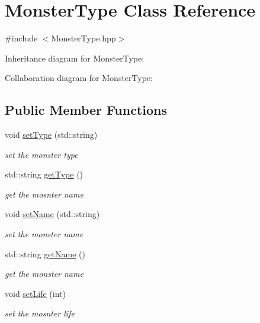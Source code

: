\hypertarget{classMonsterType}{}\section{Monster\+Type Class Reference}
\label{classMonsterType}


{\ttfamily \#include $<$Monster\+Type.\+hpp$>$}



Inheritance diagram for Monster\+Type\+:


Collaboration diagram for Monster\+Type\+:
\subsection*{Public Member Functions}
\begin{DoxyCompactItemize}
\item 
void \hyperlink{classMonsterType_ab686fdf1698aad158cbb9c5f1d8766f8}{set\+Type} (std\+::string)
\begin{DoxyCompactList}\small\item\em set the monster type \end{DoxyCompactList}\item 
std\+::string \hyperlink{classMonsterType_a470897d038ce9842e5f9e3fcffcfd3fc}{get\+Type} ()
\begin{DoxyCompactList}\small\item\em get the mosnter name \end{DoxyCompactList}\item 
void \hyperlink{classMonsterType_a6c272bfe35f1b863d261d9795cf791ca}{set\+Name} (std\+::string)
\begin{DoxyCompactList}\small\item\em set the monster name \end{DoxyCompactList}\item 
std\+::string \hyperlink{classMonsterType_a230c8883f119ff2fae237b8bcbdf6ced}{get\+Name} ()
\begin{DoxyCompactList}\small\item\em get the monster name \end{DoxyCompactList}\item 
void \hyperlink{classMonsterType_ac0db87709c0e994a5e7d6bd3fd95cdee}{set\+Life} (int)
\begin{DoxyCompactList}\small\item\em set the mosnter life \end{DoxyCompactList}\item 

\end{DoxyCompactItemize}
